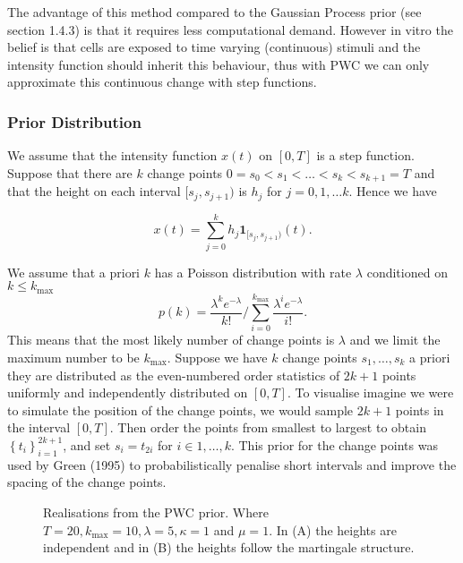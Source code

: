 \documentclass[../main.tex]{subfiles}
\begin{document}
 The advantage of this method compared to the Gaussian Process prior (see section 1.4.3) is that it requires less computational demand. However in vitro the belief is that cells are exposed to time varying (continuous) stimuli and the intensity function should inherit this behaviour, thus with PWC we can only approximate this continuous change with step functions. 
 
 \subsubsection{Prior Distribution}
 We assume that the intensity function $x(t)$ on $[0,T]$ is a step function. Suppose that there are $k$ change points $0 = s_0 < s_1 < \dots < s_k < s_{k+1} =T$ and that the height on each interval $[s_j, s_{j+1})$ is $h_j$ for $j = 0,1, \dots k$. 
 Hence we have
 
 \begin{equation}
 x(t) = \sum^k_{j=0} h_j \mathbf{1}_{[s_j,s_{j+1})} (t).
 \end{equation}
 
 { \color{blue}We assume that a priori $k$ has a Poisson distribution with rate $\lambda$ conditioned on $k \leq k_{\mathrm{max}}$
 \begin{equation}\label{eq:Poiss}
 p(k) = \frac{\lambda^k e^{-\lambda}}{k!}  \bigg/ \sum^{k_{\mathrm{max}}} _{i=0}  \frac{\lambda^i e^{-\lambda}}{i!}.
 \end{equation}
  This means that the most likely number of change points is $\lambda$ and we limit the maximum number to be $k_{\mathrm{max}}$. Suppose we have $k$ change points $s_1, \dots, s_k$ a priori  they are distributed as the even-numbered order statistics of $2k+1$ points uniformly and independently distributed on $[0,T]$. To visualise imagine we were to simulate the position of the change points, we would sample $2k+1$ points in the interval $[0,T]$. Then order the points from smallest to largest to obtain $\left\{t_i \right\}_{i=1}^{2k+1}$, and set $s_i = t_{2i}$ for $i \in 1,\dots, k$.   This prior for the change points was used by Green (1995) to probabilistically penalise short intervals and improve the spacing of the change points. }
 
  \begin{figure}[t]
   \hrulefill
   \begin{center} 
     \qquad
    \end{center}     
    \caption{Realisations from the PWC prior. Where  $T = 20,  k_{\mathrm{max}} = 10, \lambda = 5, \kappa = 1$ and $\mu = 1$. In (A) the heights are independent and in (B) the heights follow the martingale structure.  }
    \hrulefill
    \label{fig:PWCDraw}
    \end{figure}
    
\end{document}
